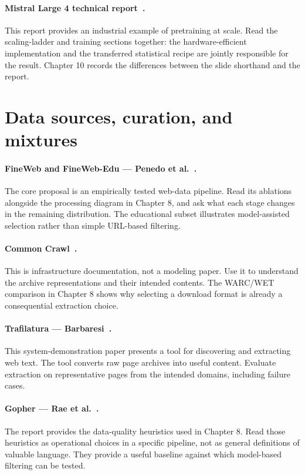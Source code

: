 \paragraph{Mistral Large 4 technical report~\cite{mistral4}.}
This report provides an industrial example of pretraining at scale. Read the scaling-ladder and training sections together: the hardware-efficient implementation and the transferred statistical recipe are jointly responsible for the result. Chapter 10 records the differences between the slide shorthand and the report.

\section{Data sources, curation, and mixtures}
\paragraph{FineWeb and FineWeb-Edu --- Penedo et al.~\cite{fineweb}.}
The core proposal is an empirically tested web-data pipeline. Read its ablations alongside the processing diagram in Chapter 8, and ask what each stage changes in the remaining distribution. The educational subset illustrates model-assisted selection rather than simple URL-based filtering.

\paragraph{Common Crawl~\cite{commoncrawl}.}
This is infrastructure documentation, not a modeling paper. Use it to understand the archive representations and their intended contents. The WARC/WET comparison in Chapter 8 shows why selecting a download format is already a consequential extraction choice.

\paragraph{Trafilatura --- Barbaresi~\cite{trafilatura}.}
This system-demonstration paper presents a tool for discovering and extracting web text. The tool converts raw page archives into useful content. Evaluate extraction on representative pages from the intended domains, including failure cases.

\paragraph{Gopher --- Rae et al.~\cite{gopher}.}
The report provides the data-quality heuristics used in Chapter 8. Read those heuristics as operational choices in a specific pipeline, not as general definitions of valuable language. They provide a useful baseline against which model-based filtering can be tested.

